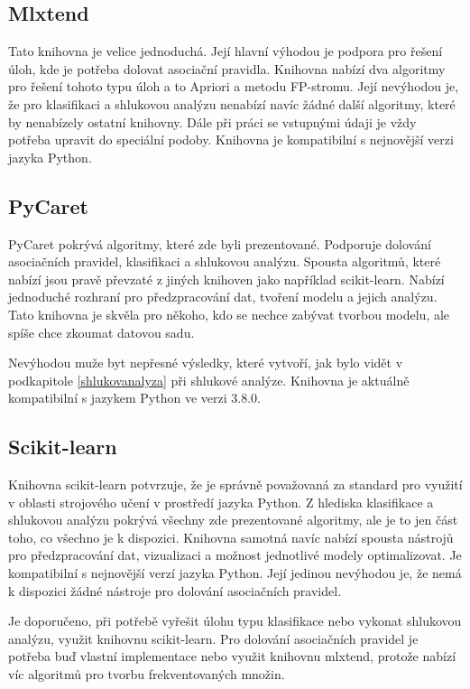 \subsection*{Mlxtend}
Tato knihovna je velice jednoduchá. Její hlavní výhodou je podpora pro řešení úloh, kde je
potřeba dolovat asociační pravidla. Knihovna nabízí dva algoritmy pro řešení tohoto typu
úloh a to Apriori a metodu FP-stromu.
Její nevýhodou je, že pro klasifikaci a shlukovou analýzu nenabízí navíc žádné další
algoritmy, které by nenabízely ostatní knihovny. Dále při práci se vstupnými údaji je vždy potřeba upravit do speciální podoby. Knihovna je kompatibilní s nejnovější verzi jazyka Python.

\subsection*{PyCaret}
PyCaret pokrývá algoritmy, které zde byli prezentované. Podporuje dolování asociačních pravidel, klasifikaci a shlukovou analýzu. Spousta algoritmů, které nabízí jsou pravě převzaté z jiných knihoven jako například scikit-learn. Nabízí jednoduché rozhraní pro předzpracování dat, tvoření modelu a jejich analýzu. Tato knihovna je skvěla pro někoho, kdo se nechce zabývat tvorbou modelu, ale spíše chce zkoumat datovou sadu. 

Nevýhodou muže byt nepřesné výsledky, které vytvoří, jak bylo vidět v podkapitole \ref{shlukovanalyza} při shlukové analýze. Knihovna je aktuálně kompatibilní s jazykem Python ve verzi 3.8.0.
\subsection*{Scikit-learn}
Knihovna scikit-learn potvrzuje, že je správně považovaná za standard pro využití v oblasti strojového učení v prostředí jazyka Python. Z hlediska klasifikace a shlukovou analýzu pokrývá všechny zde prezentované algoritmy, ale je to jen část toho, co všechno je k dispozici. Knihovna samotná navíc nabízí spousta nástrojů pro předzpracování dat, vizualizaci a možnost jednotlivé modely optimalizovat. Je kompatibilní s nejnovější verzí jazyka Python.
Její jedinou nevýhodou je, že nemá k dispozici žádné nástroje pro dolování asociačních pravidel.


Je doporučeno, při potřebě vyřešit úlohu typu klasifikace nebo vykonat shlukovou analýzu, využit knihovnu scikit-learn. Pro dolování asociačních pravidel je potřeba buď vlastní implementace nebo využit knihovnu mlxtend, protože nabízí víc algoritmů pro tvorbu frekventovaných množin.

